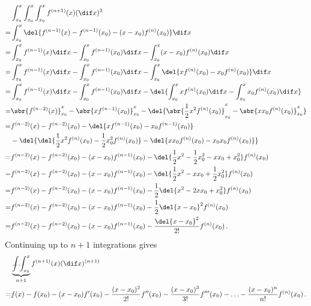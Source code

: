 \begin{align*}
  &\int_{x_0}^x\int_{x_0}^x\int_{x_0}^x{f^{(n+1)}(x)} (\dif x)^3 \\
  = &\int_{x_0}^x{\del{ f^{(n-1)}(x) - f^{(n-1)}(x_0) - (x - x_0) f^{(n)}(x_0) }}\dif x \\
  = &\int_{x_0}^x{f^{(n-1)}(x)}\dif x - \int_{x_0}^x{f^{(n-1)}(x_0)}\dif x - \int_{x_0}^x(x - x_0){f^{(n)}(x_0)}\dif x \\
  = &\int_{x_0}^x{f^{(n-1)}(x)}\dif x - \int_{x_0}^x{f^{(n-1)}(x_0)}\dif x - \int_{x_0}^x\del{x f^{(n)}(x_0) - x_0 f^{(n)}(x_0)}\dif x \\
  = &\int_{x_0}^x{f^{(n-1)}(x)}\dif x - \int_{x_0}^x{f^{(n-1)}(x_0)}\dif x - \del{ \int_{x_0}^x{x f^{(n)}(x_0)}\dif x - \int_{x_0}^x{x_0 f^{(n)}(x_0)}\dif x } \\
  = &\sbr{ f^{(n-2)}(x) }_{x_0}^x -\sbr{ x f^{(n-1)}(x_0) }_{x_0}^x - \del{ \sbr{ \frac{1}{2}x^2f^{(n)}(x_0) }_{x_0}^x - \sbr{ xx_0f^{(n)}(x_0) }_{x_0}^x } \\
  = &f^{(n-2)}(x)
    - f^{(n-2)}(x_0)
    - \del{ x f^{(n-1)}(x_0)
    - x_0 f^{(n-1)}(x_0) } \\
  &- \del{ \del{ \frac{1}{2} x^2 f^{(n)}(x_0)
    - \frac{1}{2} x_0^2 f^{(n)}(x_0) }
    - \del{ x x_0 f^{(n)}(x_0)
    - x_0 x_0 f^{(n)}(x_0) } } \\
  = &f^{(n-2)}(x)
    - f^{(n-2)}(x_0)
    - (x - x_0) f^{(n-1)}(x_0) - \del{ \frac{1}{2} x^2 - \frac{1}{2} x_0^2 - x x_0 + x_0^2 } f^{(n)}(x_0) \\
  = &f^{(n-2)}(x)
    - f^{(n-2)}(x_0)
    - (x - x_0) f^{(n-1)}(x_0) - \del{ \frac{1}{2} x^2 - x x_0 + \frac{1}{2} x_0^2 } f^{(n)}(x_0) \\
  = &f^{(n-2)}(x)
    - f^{(n-2)}(x_0)
    - (x - x_0) f^{(n-1)}(x_0) - \frac{1}{2} \del{ x^2 - 2 x x_0 + x_0^2 } f^{(n)}(x_0) \\
  = &f^{(n-2)}(x)
    - f^{(n-2)}(x_0)
    - (x - x_0) f^{(n-1)}(x_0) - \frac{1}{2} \del{ x - x_0 }^2 f^{(n)}(x_0) \\
  = &f^{(n-2)}(x)
    - f^{(n-2)}(x_0)
    - (x - x_0) f^{(n-1)}(x_0) - \frac{\del{ x - x_0 }^2}{2 !}  f^{(n)}(x_0) \, .
\end{align*}
Continuing up to $n + 1$ integrations gives
\begin{align*}
  &\underbrace{\int \hspace{-4mm} \hdots \hspace{-1mm} \int_{x_0}^x}_{n+1}{f^{(n+1)}(x)(\dif x)^{(n+1)}} \\
  = &f(x) - f(x_0) - (x - x_0) f'(x_0) - \frac{(x - x_0)^2}{2!} f''(x_0) - \frac{(x - x_0)^3}{3!} f'''(x_0) - \mathellipsis - \frac{(x - x_0)^n}{n!} f^{(n)}(x_0) \, .
\end{align*}
